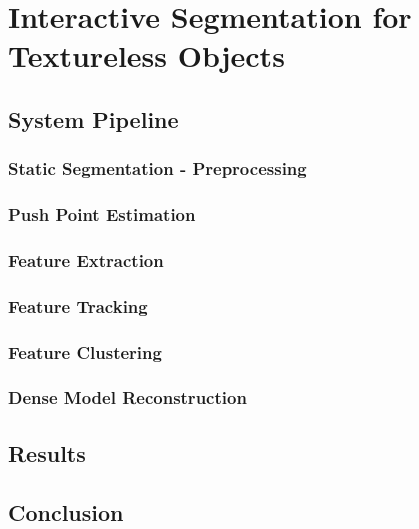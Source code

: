 \chapter{Interactive Segmentation for Textureless Objects}
\label{chapter:Textureless Segmentation}


\section{System Pipeline}
\subsection{Static Segmentation - Preprocessing}
\subsection{Push Point Estimation}
\subsection{Feature Extraction}
\subsection{Feature Tracking}
\subsection{Feature Clustering}
\subsection{Dense Model Reconstruction}

\section{Results}

\section{Conclusion}